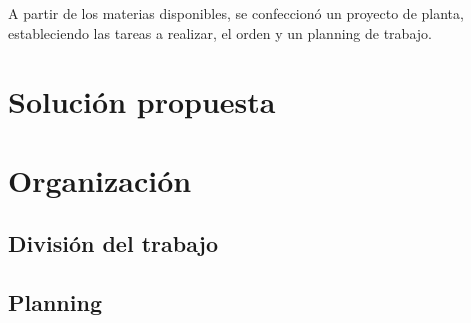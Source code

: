 A partir de los materias disponibles, se confeccionó 
un proyecto de planta, estableciendo las tareas a realizar, el orden
y un planning de trabajo.

\section{Solución propuesta}
\label{sec:SolucionPropuesta}

\section{Organización}
\label{sec:Organizacion}
\subsection{División del trabajo}
\subsection{Planning}
